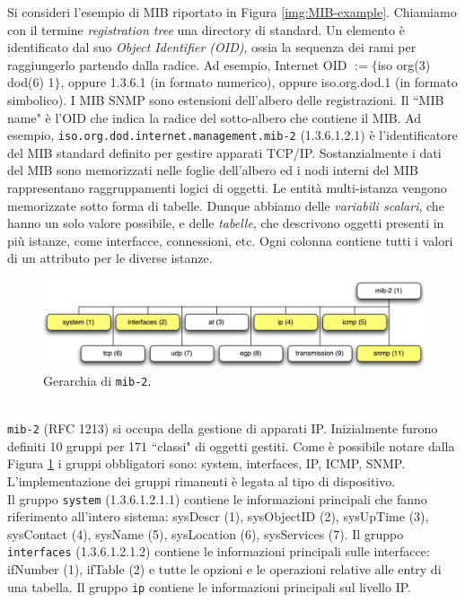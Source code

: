 Si consideri l'esempio di MIB riportato in Figura \ref{img:MIB-example}. Chiamiamo con il termine \textit{registration tree} una directory di standard. Un elemento è identificato dal suo \textit{Object Identifier (OID)}, ossia la sequenza dei rami per raggiungerlo partendo dalla radice. Ad esempio, Internet OID $:= \{$iso org(3) dod(6) 1$\}$, oppure 1.3.6.1 (in formato numerico), oppure iso.org.dod.1 (in formato simbolico). I MIB SNMP sono estensioni dell'albero delle registrazioni. Il \textquotedblleft MIB name" è l'OID che indica la radice del sotto-albero che contiene il MIB. Ad esempio, \texttt{iso.org.dod.internet.management.mib-2} (1.3.6.1.2.1) è l'identificatore del MIB standard definito per gestire apparati TCP/IP. Sostanzialmente i dati del MIB sono memorizzati nelle foglie dell'albero ed i nodi interni del MIB rappresentano raggruppamenti logici di oggetti. Le entità multi-istanza vengono memorizzate sotto forma di tabelle. Dunque abbiamo delle \textit{variabili scalari}, che hanno un solo valore possibile, e delle \textit{tabelle}, che descrivono oggetti presenti in più istanze, come interfacce, connessioni, etc. Ogni colonna contiene tutti i valori di un attributo per le diverse istanze.
\begin{figure}[htbp]
	\centering
	\includegraphics[scale = 0.55]{images/mib-2}
	\caption{Gerarchia di \texttt{mib-2}.}
	\label{img:mib-2}
\end{figure}\\
\texttt{mib-2} (RFC 1213) si occupa della gestione di apparati IP. Inizialmente furono definiti 10 gruppi per 171 \textquotedblleft classi" di oggetti gestiti. Come è possibile notare dalla Figura \ref{img:mib-2} i gruppi obbligatori sono: system, interfaces, IP, ICMP, SNMP. L'implementazione dei gruppi rimanenti è legata al tipo di dispositivo.\\
Il gruppo \texttt{system} (1.3.6.1.2.1.1) contiene le informazioni principali che fanno riferimento all'intero sistema: sysDescr (1), sysObjectID (2), sysUpTime (3), sysContact (4), sysName (5), sysLocation (6), sysServices (7). Il gruppo \texttt{interfaces} (1.3.6.1.2.1.2) contiene le informazioni principali sulle interfacce: ifNumber (1), ifTable (2) e tutte le opzioni e le operazioni relative alle entry di una tabella. Il gruppo \texttt{ip} contiene le informazioni principali sul livello IP.
